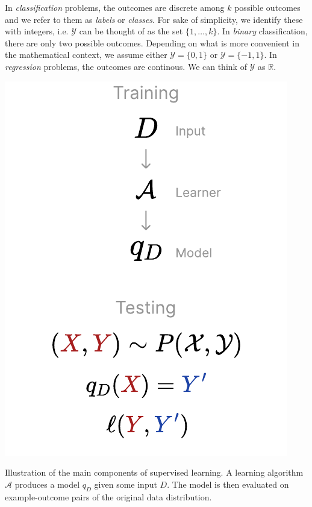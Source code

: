 \documentclass[
    a4paper, %
	fontsize=10pt, %
	twoside=false, %
]{kaobook}
\begin{document}
In \textit{classification} problems, the outcomes are discrete among $k$ possible outcomes and we refer to them as \textit{labels} or \textit{classes}. For sake of simplicity, we identify these with integers, i.e. $\mathcal{Y}$ can be thought of as the set $\{ 1, \dots, k \}$. In \textit{binary} classification, there are only two possible outcomes. Depending on what is more convenient in the mathematical context, we assume either $\mathcal{Y} = \{0,1\}$ or $\mathcal{Y} = \{-1, 1\}$.
In \textit{regression} problems, the outcomes are continous. We can think of $\mathcal{Y}$ as $\mathbb{R}$.

\begin{marginfigure}
	\includegraphics[width=\textwidth]{figma-illustrations/supervised-learning}
	\label{fig:supervised-learning}
	\caption{Illustration of the main components of supervised learning. A learning algorithm $\mathcal{A}$ produces a model $q_D$ given some input $D$. The model is then evaluated on example-outcome pairs of the original data distribution.}
\end{marginfigure}
\end{document}
